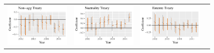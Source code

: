 \documentclass{article}
\begin{document}
\begin{figure}
\begin{tabular}{*{4}{@{}c}@{}}
\includegraphics[scale=.6]{draft_figures/rl_plots/Non-aggTreaty.pdf}   & 
\includegraphics[scale=.6]{draft_figures/rl_plots/NuetralityTreaty.pdf}  &
\includegraphics[scale=.6]{draft_figures/rl_plots/EntenteTreaty.pdf}   \\

\end{tabular}
\end{figure}
\end{document}
